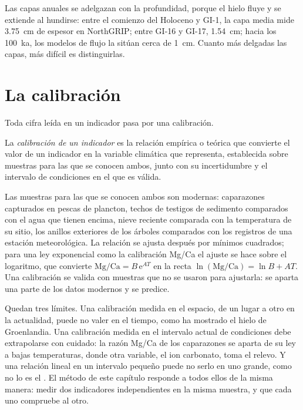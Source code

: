 Las capas anuales se adelgazan con la profundidad, porque el hielo fluye y se extiende al hundirse: entre el comienzo
del Holoceno y GI-1, la capa media mide \qty{3.75}{cm} de espesor en NorthGRIP; entre GI-16 y
GI-17, \qty{1.54}{cm}; hacia los \qty{100}{ka}, los modelos de flujo la sitúan cerca de \qty{1}{cm}. Cuanto más delgadas las capas, más difícil
es distinguirlas.

\section{La calibración}\label{sec:b2:climate-proxies:calibration}

Toda cifra leída en un indicador pasa por una calibración.

\begin{definition}\label{def:b2:climate-proxies:calibration}
La \emph{calibración de un indicador} es la relación empírica o teórica que
convierte el valor de un indicador en la variable climática que representa, establecida sobre muestras para
las que se conocen ambos, junto con su incertidumbre y el intervalo de condiciones en el que es
válida.
\end{definition}

Las muestras para las que se conocen ambos son modernas: caparazones capturados en pescas de plancton, techos de testigos de sedimento comparados con el agua que tienen encima, nieve reciente comparada con la
temperatura de su sitio, los anillos exteriores de los árboles comparados con los registros de una estación meteorológica.
La relación se ajusta después por mínimos cuadrados; para una ley exponencial como la calibración Mg/Ca
el ajuste se hace sobre el logaritmo, que convierte $\text{Mg/Ca} = B\,\mathrm{e}^{AT}$ en
la recta $\ln(\text{Mg/Ca}) = \ln B + AT$. Una calibración se valida con muestras que
no se usaron para ajustarla: se aparta una parte de los datos modernos y se predice.

Quedan tres límites. Una calibración medida en el espacio, de un lugar a otro en la actualidad, puede no valer
en el tiempo, como ha mostrado el hielo de Groenlandia. Una calibración medida en el intervalo actual de condiciones
debe extrapolarse con cuidado: la razón Mg/Ca de los caparazones se aparta de su ley a bajas temperaturas, donde
otra variable, el ion carbonato, toma el relevo. Y una relación lineal en un intervalo pequeño
puede no serlo en uno grande, como no lo es el . El método de este capítulo
responde a todos ellos de la misma manera: medir dos indicadores independientes en la misma muestra, y que cada uno
compruebe al otro.

